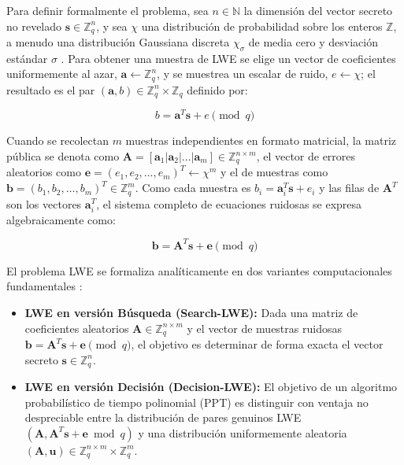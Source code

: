 Para definir formalmente el problema, sea $n \in \mathbb{N}$ la dimensión del vector secreto no revelado $\mathbf{s} \in \mathbb{Z}_q^n$, y sea $\chi$ una distribución de probabilidad sobre los enteros $\mathbb{Z}$, a menudo una distribución Gaussiana discreta $\chi_\sigma$ de media cero y desviación estándar $\sigma$ \cite{nguyen2019high, yang2025multiserver}. Para obtener una muestra de LWE se elige un vector de coeficientes uniformemente al azar, $\mathbf{a} \leftarrow \mathbb{Z}_q^n$, y se muestrea un escalar de ruido, $e \leftarrow \chi$; el resultado es el par $(\mathbf{a}, b) \in \mathbb{Z}_q^n \times \mathbb{Z}_q$ definido por:

\begin{equation}
b = \mathbf{a}^T \mathbf{s} + e \pmod q
\end{equation}

Cuando se recolectan $m$ muestras independientes en formato matricial, la matriz pública se denota como $\mathbf{A} = [\mathbf{a}_1 | \mathbf{a}_2 | \dots | \mathbf{a}_m] \in \mathbb{Z}_q^{n \times m}$, el vector de errores aleatorios como $\mathbf{e} = (e_1, e_2, \dots, e_m)^T \leftarrow \chi^m$ y el de muestras como $\mathbf{b} = (b_1, b_2, \dots, b_m)^T \in \mathbb{Z}_q^m$. Como cada muestra es $b_i = \mathbf{a}_i^T \mathbf{s} + e_i$ y las filas de $\mathbf{A}^T$ son los vectores $\mathbf{a}_i^T$, el sistema completo de ecuaciones ruidosas se expresa algebraicamente como:

\begin{equation}
\mathbf{b} = \mathbf{A}^T \mathbf{s} + \mathbf{e} \pmod q
\end{equation}

El problema LWE se formaliza analíticamente en dos variantes computacionales fundamentales \cite{regev2009lwe}:

\begin{itemize}
    \item \textbf{LWE en versión Búsqueda (Search-LWE):} Dada una matriz de coeficientes aleatorios $\mathbf{A} \in \mathbb{Z}_q^{n \times m}$ y el vector de muestras ruidosas $\mathbf{b} = \mathbf{A}^T \mathbf{s} + \mathbf{e} \pmod q$, el objetivo es determinar de forma exacta el vector secreto $\mathbf{s} \in \mathbb{Z}_q^n$.

    \item \textbf{LWE en versión Decisión (Decision-LWE):} El objetivo de un algoritmo probabilístico de tiempo polinomial (PPT) es distinguir con ventaja no despreciable entre la distribución de pares genuinos LWE $(\mathbf{A}, \mathbf{A}^T \mathbf{s} + \mathbf{e} \bmod q)$ y una distribución uniformemente aleatoria $(\mathbf{A}, \mathbf{u}) \in \mathbb{Z}_q^{n \times m} \times \mathbb{Z}_q^m$.
\end{itemize}


